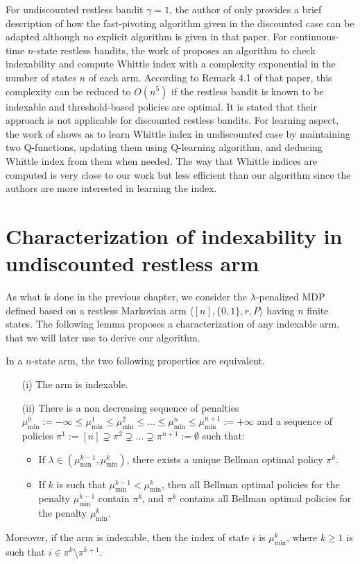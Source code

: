 For undiscounted restless bandit $\gamma=1$, the author of \cite{nino2020fast} only provides a brief description of how the fast-pivoting algorithm given in the discounted case can be adapted although no explicit algorithm is given in that paper.
For continuous-time $n$-state restless bandits, the work of \cite{ayesta2021computation} proposes an algorithm to check indexability and compute Whittle index with a complexity exponential in the number of states $n$ of each arm.
According to Remark 4.1 of that paper, this complexity can be reduced to $O(n^5)$ if the restless bandit is known to be indexable and threshold-based policies are optimal.
It is stated that their approach is not applicable for discounted restless bandits.
For learning aspect, the work of \cite{gibson2021novel} shows as to learn Whittle index in undiscounted case by maintaining two Q-functions, updating them using Q-learning algorithm, and deducing Whittle index from them when needed.
The way that Whittle indices are computed is very close to our work but less efficient than our algorithm since the authors are more interested in learning the index. 

\section{Characterization of indexability in undiscounted restless arm}
\label{ch:cpt:sec:charac}

As what is done in the previous chapter, we consider the $\lambda$-penalized MDP defined based on a restless Markovian arm $\langle[n], \{0,1\}, r, P\rangle$ having $n$ finite states.
The following lemma proposes a characterization of any indexable arm, that we will later use to derive our algorithm.
\begin{lem}
    \label{ch:cpt:lem:idx}
    In a $n$-state arm, the two following properties are equivalent.
    \begin{enumerate}
        \item[(i)] The arm is indexable.
        \item[(ii)] There is a non decreasing sequence of penalties $\mu_{\min}^0:=-\infty\le\mu^1_{\min}\le\mu^2_{\min}\le\dots\le\mu^n_{\min}\le\mu^{n+1}_{\min}:=+\infty$ and a sequence of policies $\pi^1:=[n]\supsetneq\pi^2\supsetneq\dots\supsetneq\pi^{n+1}:=\emptyset$ such that:
        \begin{itemize}
            \item If $\lambda\in(\mu^{k-1}_{\min},\mu^{k}_{\min})$, there exists a unique Bellman optimal policy $\pi^{k}$.
            \item If $k$ is such that $\mu^{k-1}_{\min}<\mu^{k}_{\min}$, then all Bellman optimal policies for the penalty $\mu^{k-1}_{\min}$ contain $\pi^{k}$, and $\pi^k$ contains all Bellman optimal policies for the penalty $\mu^k_{\min}$.
        \end{itemize}
    \end{enumerate}
    Moreover, if the arm is indexable, then the index of state $i$ is $\mu^k_{\min}$, where $k\ge1$ is such that $i\in\pi^k\setminus\pi^{k+1}$.
\end{lem}

